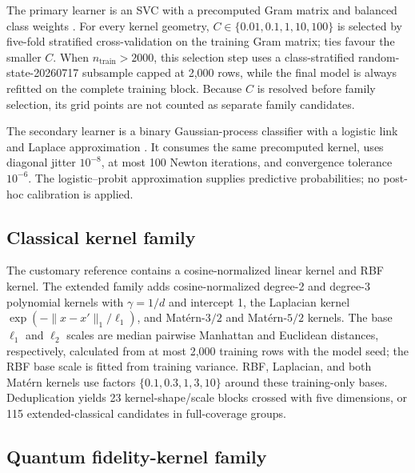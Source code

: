 \documentclass[referee,lineno,pdflatex,sn-vancouver-num]{sn-jnl}
\theoremstyle{thmstyleone}%
\theoremstyle{thmstyletwo}%
\theoremstyle{thmstylethree}%
\begin{document}
The primary learner is an SVC with a precomputed Gram matrix and balanced class weights \cite{cortes1995svm}. For every kernel geometry, $C\in\{0.01,0.1,1,10,100\}$ is selected by five-fold stratified cross-validation on the training Gram matrix; ties favour the smaller $C$. When $n_{\mathrm{train}}>2000$, this selection step uses a class-stratified random-state-20260717 subsample capped at 2,000 rows, while the final model is always refitted on the complete training block. Because $C$ is resolved before family selection, its grid points are not counted as separate family candidates.

The secondary learner is a binary Gaussian-process classifier with a logistic link and Laplace approximation \cite{rasmussen2006gpml}. It consumes the same precomputed kernel, uses diagonal jitter $10^{-8}$, at most 100 Newton iterations, and convergence tolerance $10^{-6}$. The logistic--probit approximation supplies predictive probabilities; no post-hoc calibration is applied.

\subsection{Classical kernel family}

The customary reference contains a cosine-normalized linear kernel and RBF kernel. The extended family adds cosine-normalized degree-2 and degree-3 polynomial kernels with $\gamma=1/d$ and intercept 1, the Laplacian kernel $\exp(-\|x-x'\|_1/\ell_1)$, and Mat\'ern-$3/2$ and Mat\'ern-$5/2$ kernels. The base $\ell_1$ and $\ell_2$ scales are median pairwise Manhattan and Euclidean distances, respectively, calculated from at most 2,000 training rows with the model seed; the RBF base scale is fitted from training variance. RBF, Laplacian, and both Mat\'ern kernels use factors $\{0.1,0.3,1,3,10\}$ around these training-only bases. Deduplication yields 23 kernel-shape/scale blocks crossed with five dimensions, or 115 extended-classical candidates in full-coverage groups.

\subsection{Quantum fidelity-kernel family}
\end{document}
